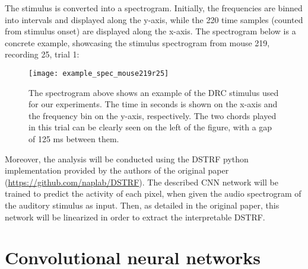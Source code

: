 The stimulus is converted into a spectrogram. Initially, the frequencies are binned into intervals and displayed along the y-axis, while the 220 time samples (counted from stimulus onset) are displayed along the x-axis. The spectrogram below is a concrete example, showcasing the stimulus spectrogram from mouse 219, recording 25, trial 1:

\begin{figure}[ht]
\centering
	\texttt{[image: example\_spec\_mouse219r25]}
\caption{The spectrogram above shows an example of the DRC stimulus used for our experiments. The time in seconds is shown on the x-axis and the frequency bin on the y-axis, respectively. The two chords played in this trial can be clearly seen on the left of the figure, with a gap of 125 ms between them.}
\end{figure}

Moreover, the analysis will be conducted using the DSTRF python implementation provided by the authors of the original paper (\url{https://github.com/naplab/DSTRF}). The described CNN network will be trained to predict the activity of each pixel, when given the audio spectrogram of the auditory stimulus as input. Then, as detailed in the original paper, this network will be linearized in order to extract the interpretable DSTRF.

\section{Convolutional neural networks}


